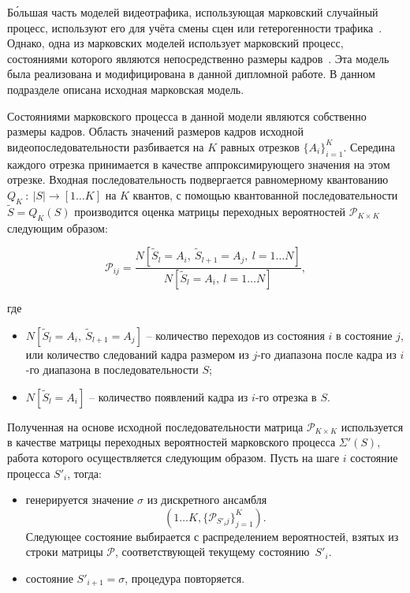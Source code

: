 Б\'{о}льшая часть моделей видеотрафика, использующая марковский
случайный процесс, используют его для учёта смены сцен
или гетерогенности трафика~\cite{raey}. Однако, одна из
марковских моделей использует марковский процесс, состояниями
которого являются непосредственно размеры кадров~\cite{heymanATM}.
Эта модель была реализована и модифицирована в данной дипломной
работе. В данном подразделе описана исходная марковская модель.

Состояниями марковского процесса в данной модели являются
собственно размеры кадров. Область значений размеров кадров
исходной видеопоследовательности разбивается на $K$ равных
отрезков $\{A_i\} _{i=1}^K$.
Середина каждого отрезка принимается в качестве
аппроксимирующего значения на этом отрезке. Входная
последовательность подвергается равномерному квантованию $Q_K~:~|S|\rightarrow [1 \dots K]$
на $K$ квантов, с помощью квантованной последовательности
$\widetilde{S} = Q_K(S)$ производится оценка матрицы переходных
вероятностей $\mathcal{P}_{K\times K}$ следующим образом:

\begin{equation}
    \mathcal{P}_{ij} = \frac{N[\widetilde{S}_l = A_i,~\widetilde{S}_{l+1} = A_j,~l=1\dots N]}
                            {N[\widetilde{S}_l = A_i,~l=1\dots N]},
\end{equation}

где
\begin{itemize}
    \item $N[\widetilde{S}_l = A_i,~\widetilde{S}_{l+1} = A_j]$ -- количество переходов
        из состояния $i$ в состояние $j$, или количество следований кадра размером
        из $j$-го диапазона после кадра из $i$-го диапазона в последовательности $S$;
    \item $N[\widetilde{S}_l = A_i]$ -- количество появлений кадра из $i$-го отрезка в $S$.
\end{itemize}

Полученная на основе исходной последовательности матрица $\mathcal{P}_{K\times K}$
используется в качестве матрицы переходных вероятностей марковского процесса
$\Sigma'(S)$, работа которого осуществляется следующим образом. Пусть
на шаге $i$ состояние процесса $S'_i$, тогда:

\begin{itemize}
    \item генерируется значение $\sigma$ из дискретного ансамбля $$(1 \dots K, \{\mathcal{P}_{S'_ij}\} _{j = 1}^K).$$
        Следующее состояние выбирается с распределением вероятностей, взятых из строки матрицы $\mathcal{P}$,
        соответствующей текущему состоянию~$S'_i$.
    \item состояние $S'_{i+1} = \sigma$, процедура повторяется.
\end{itemize}

